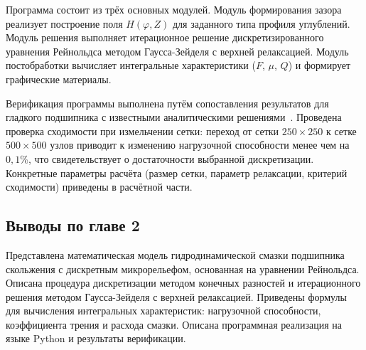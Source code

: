 Программа состоит из трёх основных модулей. Модуль формирования зазора реализует построение поля $H(\varphi, Z)$ для заданного типа профиля углублений. Модуль решения выполняет итерационное решение дискретизированного уравнения Рейнольдса методом Гаусса-Зейделя с верхней релаксацией. Модуль постобработки вычисляет интегральные характеристики ($F$, $\mu$, $Q$) и формирует графические материалы.

Верификация программы выполнена путём сопоставления результатов для гладкого подшипника с известными аналитическими решениями~\cite{pinkus}. Проведена проверка сходимости при измельчении сетки: переход от сетки $250 \times 250$ к сетке $500 \times 500$ узлов приводит к изменению нагрузочной способности менее чем на $0{,}1$\%, что свидетельствует о достаточности выбранной дискретизации. Конкретные параметры расчёта (размер сетки, параметр релаксации, критерий сходимости) приведены в расчётной части.

\subsection*{Выводы по главе 2}
{}

Представлена математическая модель гидродинамической смазки подшипника скольжения с дискретным микрорельефом, основанная на уравнении Рейнольдса. Описана процедура дискретизации методом конечных разностей и итерационного решения методом Гаусса-Зейделя с верхней релаксацией. Приведены формулы для вычисления интегральных характеристик: нагрузочной способности, коэффициента трения и расхода смазки. Описана программная реализация на языке Python и результаты верификации.

